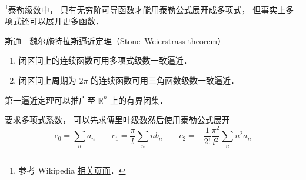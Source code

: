 

\footnote{参考 Wikipedia \href{https://en.wikipedia.org/wiki/Stone–Weierstrass theorem}{相关页面}．}泰勒级数中， 只有无穷阶可导函数才能用泰勒公式展开成多项式， 但事实上多项式还可以展开更多函数．

\begin{theorem}{斯通—魏尔施特拉斯逼近定理（Stone–Weierstrass theorem）}
\begin{enumerate}
斯通—魏尔施特拉斯逼近定理有两个
\item 闭区间上的连续函数可用多项式级数一致逼近．
\item 闭区间上周期为 $2\pi$ 的连续函数可用三角函数级数一致逼近．
\end{enumerate}
第一逼近定理可以推广至 $\mathbb {R}^{n}$ 上的有界闭集．
\end{theorem}

要求多项式系数， 可以先求傅里叶级数然后使用泰勒公式展开
\begin{equation}
c_0 = \sum_n a_n
\qquad
c_1 = \frac{\pi}{l} \sum_n n b_n
\qquad
c_2 = -\frac{1}{2!}\frac{\pi^2}{l^2} \sum_n n^2 a_n
\end{equation}

